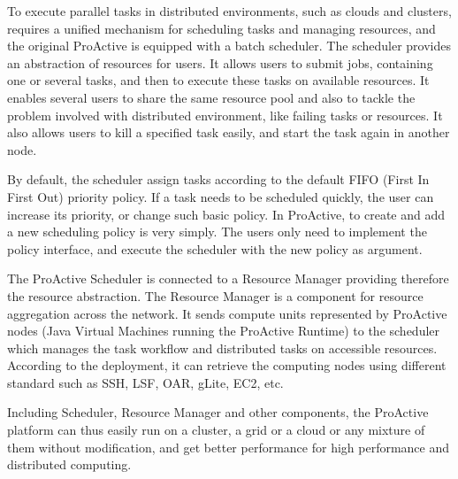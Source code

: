 To execute parallel tasks in distributed environments, such as clouds and clusters, requires a unified mechanism for scheduling tasks and managing resources, and the original ProActive is equipped with a batch scheduler. %
The scheduler provides an abstraction of resources for users. It allows users to submit jobs, containing one or several tasks, and then to execute these tasks on available resources. It enables several users to share the same resource pool and also to tackle the problem involved with distributed environment, like failing tasks or resources. It also allows users to kill a specified task easily, and start the task again in another node.

By default, the scheduler assign tasks according to the default FIFO (First In First Out) priority policy. If a task needs to be scheduled quickly, the user can increase its priority, or change such basic policy. In ProActive, to create and add a new scheduling policy is very simply. The users only need to implement the policy interface, and execute the scheduler with the new policy as argument.

The ProActive Scheduler is connected to a Resource Manager providing therefore the resource abstraction. %
The Resource Manager is a component for resource aggregation across the network. It sends compute units represented by ProActive nodes (Java Virtual Machines running the ProActive Runtime)   to the scheduler which manages the task workflow and distributed tasks on accessible resources. According to the deployment, it can retrieve the computing nodes using different standard such as SSH, LSF, OAR, gLite, EC2, etc.

Including Scheduler, Resource Manager and other components, the ProActive platform can thus easily run on a cluster, a grid or a cloud or any mixture of them without modification, and get better performance for high performance and distributed computing.

